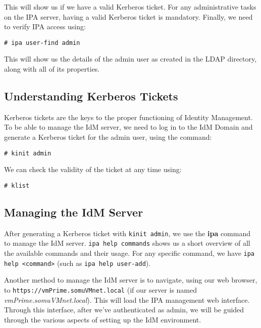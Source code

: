\noindent	
This will show us if we have a valid Kerberos ticket. For any administrative tasks on the IPA server, having a valid Kerberos ticket is mandatory. Finally, we need to verify IPA access using:

\vspace{-15pt}
\begin{verbatim}
# ipa user-find admin
\end{verbatim}
\vspace{-10pt}

\noindent
This will show us the details of the admin user as created in the LDAP directory, along with all of its properties. 

\subsection{Understanding Kerberos Tickets}
Kerberos tickets are the keys to the proper functioning of Identity Management. To be able to manage the IdM server, we need to log in to the IdM Domain and generate a Kerberos ticket for the admin user, using the command:

\vspace{-15pt}
\begin{verbatim}
# kinit admin
\end{verbatim}
\vspace{-10pt}

\noindent
We can check the validity of the ticket at any time using:

\vspace{-15pt}
\begin{verbatim}
# klist
\end{verbatim}
\vspace{-10pt}

\subsection{Managing the IdM Server}
After generating a Kerberos ticket with \verb|kinit admin|, we use the \textbf{ipa} command to manage the IdM server. \verb|ipa help commands| shows us a short overview of all the available commands and their usage. For any specific command, we have \verb|ipa help <command>| (such as \verb|ipa help user-add|).

Another method to manage the IdM server is to navigate, using our web browser, to \verb|https://vmPrime.somuVMnet.local| (if our server is named \textit{vmPrime.somuVMnet.local}). This will load the IPA management web interface. Through this interface, after we've authenticated as admin, we will be guided through the various aspects of setting up the IdM environment. 

